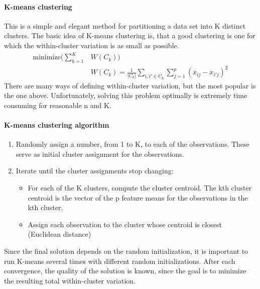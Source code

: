 \documentclass[../document.tex]{subfiles}
\begin{document}
	\paragraph{K-means clustering}
	This is a simple and elegant method for partitioning a data set into K distinct clusters. The basic idea of K-means clustering is, that a good clustering is one for which the within-cluster variation is as small as possible. 
	\begin{equation}
	\begin{split}
		\text{minimize}(\sum_{k=1}^{K}&W(C_{k}))\\
		&W(C_{k})=\frac{1}{|C_{k}|}\sum_{i,i'\in C_{k}}\sum_{j=1}^{p}(x_{ij}-x_{i'j})^2
	\end{split}
	\end{equation}
	There are many ways of defining within-cluster variation, but the most popular is the one above. Unfortunately, solving this problem optimally is extremely time consuming for reasonable n and K.
	\paragraph{K-means clustering algorithm}
	\begin{enumerate}
		\item Randomly assign a number, from 1 to K, to each of the observations. These serve as initial cluster assignment for the observations. 
		\item Iterate until the cluster assignments stop changing:
		\begin{itemize}
			\item For each of the K clusters, compute the cluster centroid. The kth cluster centroid is the vector of the p feature means for the observations in the kth cluster.
			\item Assign each observation to the cluster whose centroid is closest (Euclidean distance)
		\end{itemize}
	\end{enumerate}
	Since the final solution depends on the random initialization, it is important to run K-means several times with different random initializations. After each convergence, the quality of the solution is known, since the goal is to minimize the resulting total within-cluster variation.
\end{document}
